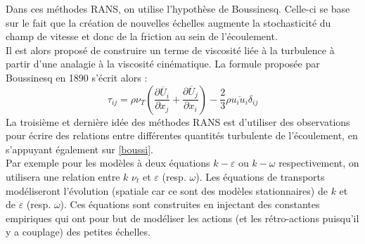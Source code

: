 \documentclass[a4paper,12pt]{article}
\newcommand{\bepar}[1]{
	\left( #1 \right)  
}
\newcommand{\keps}{$k-\varepsilon$}
\numberwithin{equation}{section} %
\begin{document}
\noindent Dans ces méthodes RANS, on utilise l'hypothèse de Boussinesq. Celle-ci se base sur le fait que la création de nouvelles échelles augmente la stochasticité du champ de vitesse et donc de la friction au sein de l'écoulement.\\
  Il est alors proposé de construire un terme de viscosité liée à la turbulence à partir d'une analagie à la viscosité cinématique. La formule proposée par Boussinesq en 1890 s'écrit alors : 
\begin{equation}
\tau_{ij} = \rho \nu_T\bepar{\frac{\partial \overline{U}_i}{\partial x_j} + \frac{\partial \overline{U}_j}{\partial x_i}} - \frac{2}{3} \rho \overline{u_iu_i} \delta_{ij} \label{boussi}
\end{equation} 
La troisième et dernière idée des méthodes RANS est d'utiliser des observations pour écrire des relations entre différentes quantités turbulente de l'écoulement, en s'appuyant également sur \eqref{boussi}. \\
Par exemple pour les modèles à deux équations \keps $ $ ou $k-\omega$ respectivement, on utilisera une relation entre $k$ $\nu_t$ et $\varepsilon$ (resp. $\omega$). Les équations de transports modéliseront l'évolution (spatiale car ce sont des modèles stationnaires) de $k$ et de $\varepsilon$ (resp. $\omega$). Ces équations sont construites en injectant des constantes empiriques qui ont pour but de modéliser les actions (et les rétro-actions puisqu'il y a couplage) des petites échelles.\\

\end{document}
